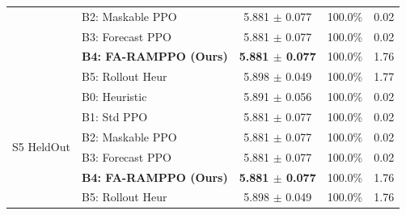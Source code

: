 \begin{table}[t]
\begin{tabular}{llccc}
 & B2: Maskable PPO & 5.881 $\pm$ 0.077 & 100.0\% & 0.02 \\
 & B3: Forecast PPO & 5.881 $\pm$ 0.077 & 100.0\% & 0.02 \\
 & \textbf{B4: FA-RAMPPO (Ours)} & \textbf{5.881 $\pm$ 0.077} & 100.0\% & 1.76 \\
 & B5: Rollout Heur & 5.898 $\pm$ 0.049 & 100.0\% & 1.77 \\
\midrule
\multirow{6}{*}{S5 HeldOut} & B0: Heuristic & 5.891 $\pm$ 0.056 & 100.0\% & 0.02 \\
 & B1: Std PPO & 5.881 $\pm$ 0.077 & 100.0\% & 0.02 \\
 & B2: Maskable PPO & 5.881 $\pm$ 0.077 & 100.0\% & 0.02 \\
 & B3: Forecast PPO & 5.881 $\pm$ 0.077 & 100.0\% & 0.02 \\
 & \textbf{B4: FA-RAMPPO (Ours)} & \textbf{5.881 $\pm$ 0.077} & 100.0\% & 1.76 \\
 & B5: Rollout Heur & 5.898 $\pm$ 0.049 & 100.0\% & 1.76 \\
\bottomrule
\end{tabular}
\end{table}
